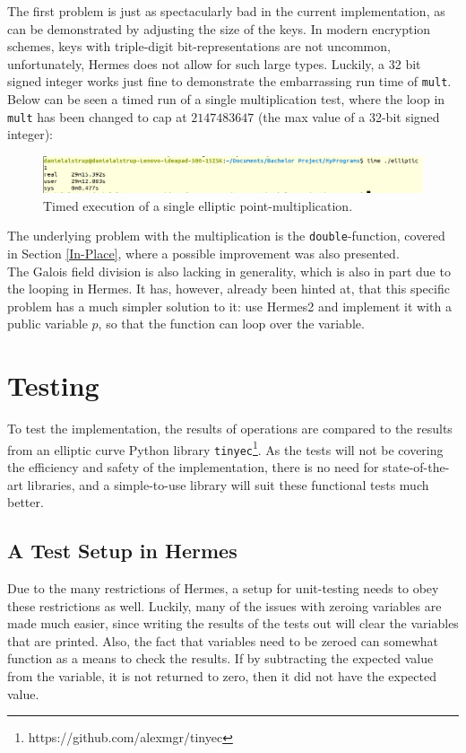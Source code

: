 The first problem is just as spectacularly bad in the current implementation, as can be demonstrated by adjusting the size of the keys. In modern encryption schemes, keys with triple-digit bit-representations are not uncommon, unfortunately, Hermes does not allow for such large types. Luckily, a 32 bit signed integer works just fine to demonstrate the embarrassing run time of \texttt{mult}. Below can be seen a timed run of a single multiplication test, where the loop in \texttt{mult} has been changed to cap at $2147483647$ (the max value of a 32-bit signed integer):
\begin{figure}[H]
    \centering
    \includegraphics[width=1.0\textwidth]{figures/timeElliptic}
    \caption{Timed execution of a single elliptic point-multiplication.}
\end{figure}
\noindent The underlying problem with the multiplication is the \texttt{double}-function, covered in Section \ref{In-Place}, where a possible improvement was also presented. \\

The Galois field division is also lacking in generality, which is also in part due to the looping in Hermes. It has, however, already been hinted at, that this specific problem has a much simpler solution to it: use Hermes2 and implement it with a public variable $p$, so that the function can loop over the variable. 
\section{Testing}
To test the implementation, the results of operations are compared to the results from an elliptic curve Python library \texttt{tinyec}\footnote{https://github.com/alexmgr/tinyec}. As the tests will not be covering the efficiency and safety of the implementation, there is no need for state-of-the-art libraries, and a simple-to-use library will suit these functional tests much better.

\subsection{A Test Setup in Hermes}
Due to the many restrictions of Hermes, a setup for unit-testing needs to obey these restrictions as well. Luckily, many of the issues with zeroing variables are made much easier, since writing the results of the tests out will clear the variables that are printed. Also, the fact that variables need to be zeroed can somewhat function as a means to check the results. If by subtracting the expected value from the variable, it is not returned to zero, then it did not have the expected value.

